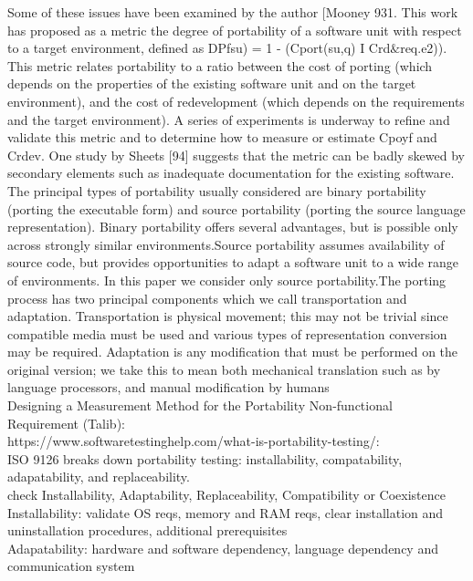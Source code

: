 \documentclass{article}
\begin{document}
 Some of these issues have been examined by the author
 [Mooney 931. This work has proposed as a metric the degree of
 portability
 of a software unit with respect to a target
 environment, defined as
 DPfsu) = 1 - (Cport(su,q) I Crd$\&$req.e2)).\\
 This metric relates portability to a ratio between the cost
 of porting (which depends on the properties of the existing
 software unit and on the target environment), and the cost of
 redevelopment (which depends on the requirements and the
 target environment). A series of experiments is underway to
 refine and validate this metric and to determine how to measure
 or estimate Cpoyf and Crdev.
 One study by Sheets [94]
 suggests that the metric can be badly skewed by secondary
 elements such as inadequate documentation for the existing
 software.\\
  
  The principal types of portability usually considered are binary portability (porting the executable form) and source portability (porting the source language representation). Binary portability offers several advantages, but is possible only across strongly similar environments.Source portability assumes availability of source code, but provides opportunities to adapt a software unit to a wide range of environments.  In this paper we consider only source portability.The porting process has two principal components which we call transportation and adaptation.  Transportation is physical movement;  this may not be trivial since compatible media must be used and various types of representation conversion may be required.  Adaptation is any modification that must be performed on the original version;  we take this to mean both mechanical translation such as by language processors, and manual modification by humans\\ 

\noindent Designing a Measurement Method for the Portability Non-functional Requirement (Talib):\\
 
\noindent https://www.softwaretestinghelp.com/what-is-portability-testing/:\\

ISO 9126 breaks down portability testing: installability, compatability, adapatability, and replaceability.\\ 

check Installability, Adaptability, Replaceability, Compatibility or Coexistence\\

Installability: validate OS reqs, memory and RAM reqs, clear installation and uninstallation procedures, additional prerequisites\\

Adapatability: hardware and software dependency, language dependency and communication system\\
\end{document}
